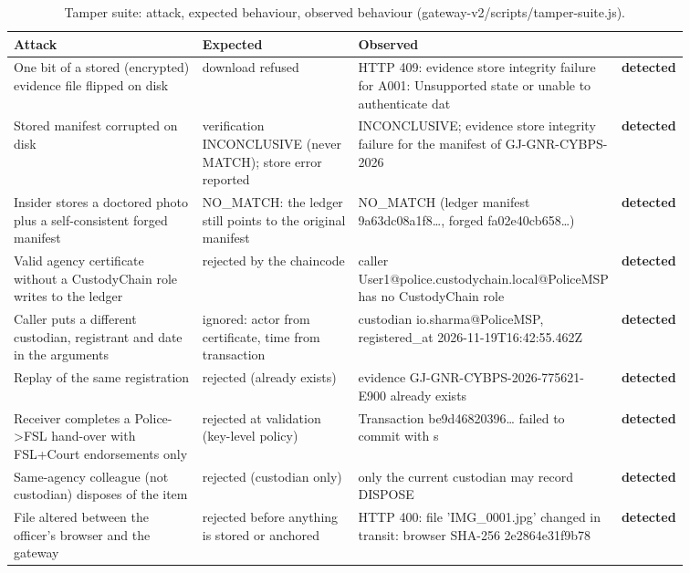 \begin{longtable}{@{}p{0.30\linewidth}p{0.24\linewidth}p{0.32\linewidth}l@{}}
\caption{Tamper suite: attack, expected behaviour, observed behaviour (gateway-v2/scripts/tamper-suite.js).}\label{tab:tamper}\\
\toprule
Attack & Expected & Observed & \\ \midrule\endhead
One bit of a stored (encrypted) evidence file flipped on disk & download refused & \footnotesize HTTP 409: evidence store integrity failure for A001: Unsupported state or unable to authenticate dat & \textbf{detected}\\
Stored manifest corrupted on disk & verification INCONCLUSIVE (never MATCH); store error reported & \footnotesize INCONCLUSIVE; evidence store integrity failure for the manifest of GJ-GNR-CYBPS-2026 & \textbf{detected}\\
Insider stores a doctored photo plus a self-consistent forged manifest & NO\_MATCH: the ledger still points to the original manifest & \footnotesize NO\_MATCH (ledger manifest 9a63dc08a1f8\ldots{}, forged fa02e40cb658\ldots{}) & \textbf{detected}\\
Valid agency certificate without a CustodyChain role writes to the ledger & rejected by the chaincode & \footnotesize caller User1@\allowbreak{}police.\allowbreak{}custodychain.\allowbreak{}local@\allowbreak{}PoliceMSP has no CustodyChain role & \textbf{detected}\\
Caller puts a different custodian, registrant and date in the arguments & ignored: actor from certificate, time from transaction & \footnotesize custodian io.\allowbreak{}sharma@\allowbreak{}PoliceMSP, registered\_at 2026-11-19T16:42:55.\allowbreak{}462Z & \textbf{detected}\\
Replay of the same registration & rejected (already exists) & \footnotesize evidence GJ-GNR-CYBPS-2026-775621-E900 already exists & \textbf{detected}\\
Receiver completes a Police-\textgreater{}FSL hand-over with FSL+Court endorsements only & rejected at validation (key-level policy) & \footnotesize Transaction be9d46820396\ldots{} failed to commit with s & \textbf{detected}\\
Same-agency colleague (not custodian) disposes of the item & rejected (custodian only) & \footnotesize only the current custodian may record DISPOSE & \textbf{detected}\\
File altered between the officer's browser and the gateway & rejected before anything is stored or anchored & \footnotesize HTTP 400: file 'IMG\_0001.\allowbreak{}jpg' changed in transit: browser SHA-256 2e2864e31f9b78 & \textbf{detected}\\
\bottomrule
\end{longtable}
